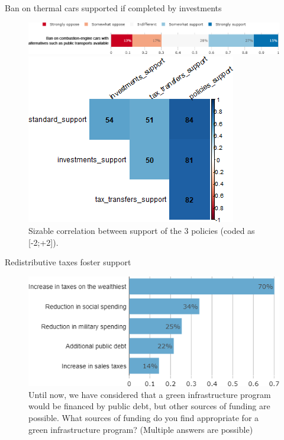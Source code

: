 \begin{framefont}{\small}
\begin{frame}{Ban on thermal cars supported if completed by investments}%
\begin{figure}[h!]
\centering
\caption{Do you support or oppose a ban on combustion-engine cars where alternatives such as public transports are made available to people?}
\includegraphics[width=.87\paperwidth]{../figures/FR/standard_public_transport_support_FR.png}
\caption{Sizable correlation between support of the 3 policies (coded as [-2;+2]).}
\includegraphics[width=.32\paperwidth]{../figures/FR/corr_support_FR.png}
\end{figure}
\end{frame}

\begin{frame}{Redistributive taxes foster support}%
\begin{figure}[h!]
\centering
\caption{Until now, we have considered that a green infrastructure program would be financed by public debt, but other sources of funding are possible.
What sources of funding do you find appropriate for a green infrastructure program? (Multiple answers are possible)}
\includegraphics[width=.7\paperwidth]{../figures/FR/investments_funding_FR.png}
\end{figure}
\end{frame}


\end{framefont}
